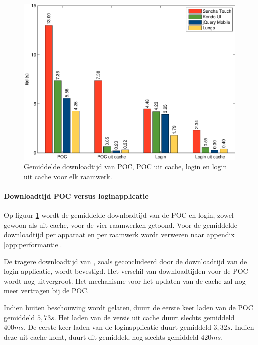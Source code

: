 \begin{figure}
 \centering
 \includegraphics[width=\textwidth]{figuren/performance-nl.pdf}
 \caption{Gemiddelde downloadtijd van POC,  POC uit cache,  login en login uit cache voor elk raamwerk.}
 \label{fig:performantie}
\end{figure}

\paragraph{Downloadtijd POC versus loginapplicatie}
Op figuur \ref{fig:performantie} wordt de gemiddelde downloadtijd van de POC en login, zowel gewoon als uit cache, voor de vier raamwerken getoond.
Voor de gemiddelde downloadtijd per apparaat en per raamwerk wordt verwezen naar appendix \ref{app:performantie}.


De tragere downloadtijd van \st{},  zoals geconcludeerd door de downloadtijd van de login applicatie, wordt bevestigd.
Het verschil van downloadtijden voor de POC wordt nog uitvergroot.
Het mechanisme voor het updaten van de cache zal \st{} nog meer vertragen bij de POC.

Indien \st{} buiten beschouwing wordt gelaten, duurt de eerste keer laden van de POC gemiddeld $5,73\unit{s}$. 
Het laden van de versie uit cache duurt slechts gemiddeld $400\unit{ms}$.
De eerste keer laden van de loginapplicatie duurt gemiddeld $3,32\unit{s}$.
Indien deze uit cache komt, duurt dit gemiddeld nog slechts gemiddeld $420\unit{ms}$.

